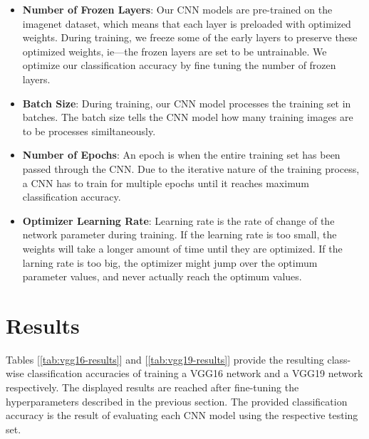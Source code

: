 \begin{itemize}
  \item \textbf{Number of Frozen Layers}: Our CNN models are pre-trained on the imagenet dataset, which means that each layer is preloaded with optimized weights. During training, we freeze some of the early layers to preserve these optimized weights, ie—the frozen layers are set to be untrainable. We optimize our classification accuracy by fine tuning the number of frozen layers.
  \item \textbf{Batch Size}: During training, our CNN model processes the training set in batches. The batch size tells the CNN model how many training images are to be processes similtaneously.
  \item \textbf{Number of Epochs}: An epoch is when the entire training set has been passed through the CNN. Due to the iterative nature of the training process, a CNN has to train for multiple epochs until it reaches maximum classification accuracy.
  \item \textbf{Optimizer Learning Rate}: Learning rate is the rate of change of the network parameter during training. If the learning rate is too small, the weights will take a longer amount of time until they are optimized. If the larning rate is too big, the optimizer might jump over the optimum parameter values, and never actually reach the optimum values.
\end{itemize}

\section{Results}

Tables [\ref{tab:vgg16-results}] and [\ref{tab:vgg19-results}] provide the resulting class-wise classification accuracies of training a VGG16 network and a VGG19 network respectively. The displayed results are reached after fine-tuning the hyperparameters described in the previous section. The provided classification accuracy is the result of evaluating each CNN model using the respective testing set.


